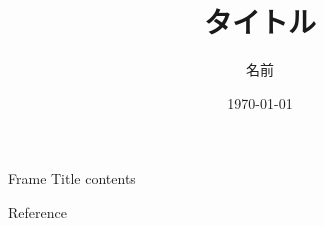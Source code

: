 \documentclass[t,aspectratio=169,dvipdfmx,cjk,usepdftitle=false]{beamer}  %
\theoremstyle{definition}
\theoremstyle{example}
\begin{document}
\title[title]{タイトル}
\author[Name]{名前}%
\date{\today}

\begin{frame}                  %
\titlepage                     %
\end{frame}

\begin{frame}                  %
\tableofcontents
\end{frame}

\begin{frame}{Frame Title}
contents
\end{frame}

\begin{frame}[allowframebreaks]{Reference}
\scriptsize
\beamertemplatetextbibitems
%
%
\end{frame}
\end{document}
